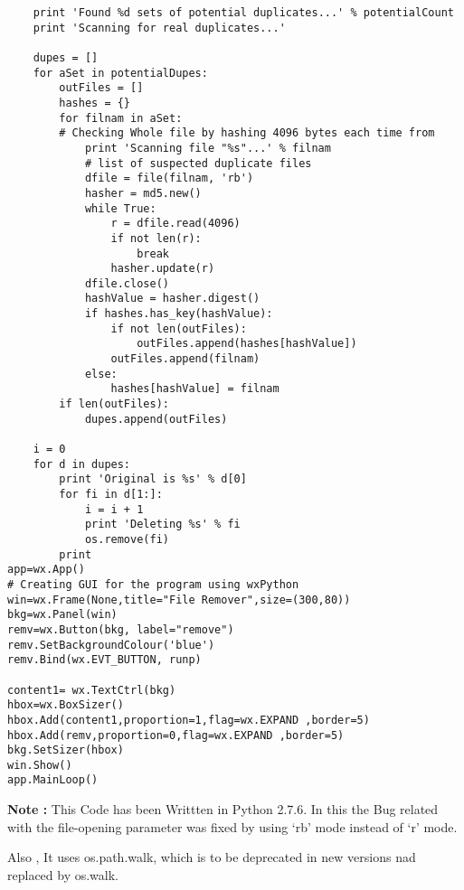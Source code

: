 \begin{lstlisting}
    print 'Found %d sets of potential duplicates...' % potentialCount
    print 'Scanning for real duplicates...'

    dupes = []
    for aSet in potentialDupes:
        outFiles = []
        hashes = {}
        for filnam in aSet:                           
        # Checking Whole file by hashing 4096 bytes each time from 
            print 'Scanning file "%s"...' % filnam    
            # list of suspected duplicate files
            dfile = file(filnam, 'rb')
            hasher = md5.new()
            while True:
                r = dfile.read(4096)
                if not len(r):
                    break
                hasher.update(r)
            dfile.close()
            hashValue = hasher.digest()
            if hashes.has_key(hashValue):
                if not len(outFiles):
                    outFiles.append(hashes[hashValue])
                outFiles.append(filnam)
            else:
                hashes[hashValue] = filnam
        if len(outFiles):
            dupes.append(outFiles)

    i = 0
    for d in dupes:
        print 'Original is %s' % d[0]
        for fi in d[1:]:
            i = i + 1
            print 'Deleting %s' % fi
            os.remove(fi)
        print
app=wx.App()                                    
# Creating GUI for the program using wxPython
win=wx.Frame(None,title="File Remover",size=(300,80))
bkg=wx.Panel(win)
remv=wx.Button(bkg, label="remove")
remv.SetBackgroundColour('blue')
remv.Bind(wx.EVT_BUTTON, runp)

content1= wx.TextCtrl(bkg)
hbox=wx.BoxSizer()
hbox.Add(content1,proportion=1,flag=wx.EXPAND ,border=5)
hbox.Add(remv,proportion=0,flag=wx.EXPAND ,border=5)
bkg.SetSizer(hbox)
win.Show()
app.MainLoop()

\end{lstlisting}
\vspace{3.5in}
 \textbf {Note :}
This Code has been Writtten in Python 2.7.6.
In this the Bug related with the file-opening parameter was fixed by using `rb' mode instead of `r' mode.

Also ,
It uses os.path.walk, which is to be deprecated in new versions nad replaced by os.walk.
